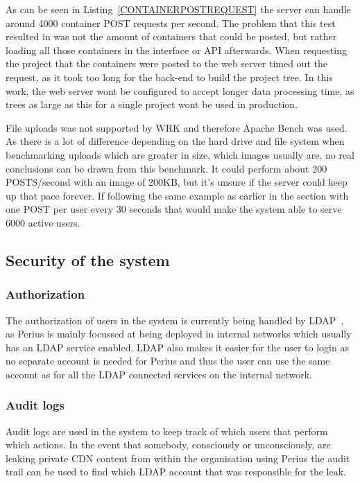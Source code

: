 \documentclass[a4paper,12pt]{article}
\begin{document}
As can be seen in Listing~\ref{CONTAINERPOSTREQUEST} the server can handle around 4000 container
POST requests per second. The problem that this test resulted in was not the amount of containers
that could be posted, but rather loading all those containers in the interface or API afterwards.
When requesting the project that the containers were posted to the web server timed out the request,
as it took too long for the back-end to build the project tree. In this work, the web server wont 
be configured to accept longer data processing time, as trees as large as this for a single project
wont be used in production.

\par
File uploads was not supported by WRK and therefore Apache Bench was used. As there is a lot of
difference depending on the hard drive and file system when benchmarking uploads which are greater
in size, which images usually are, no real conclusions can be drawn from this benchmark. It could
perform about 200 POSTS/second with an image of 200KB, but it's unsure if the server could
keep up that pace forever. If following the same example as earlier in the section with one POST per
user every 30 seconds that would make the system able to serve 6000 active users.

\newpage
\subsection{Security of the system}
\subsubsection{Authorization}
The authorization of users in the system is currently being handled by LDAP~\cite{LDAP}, as Perius 
is mainly focussed at being deployed in internal networks which usually has an LDAP service enabled. 
LDAP also makes it easier for the user to login as no separate account is needed for Perius and 
thus the user can use the same account as for all the LDAP connected services on the internal 
network.

\subsubsection{Audit logs}
Audit logs are used in the system to keep track of which users that perform which actions. In the
event that somebody, consciously or unconsciously, are leaking private CDN content from within the
organisation using Perius the audit trail can be used to find which LDAP account that was
responsible for the leak.
\end{document}
